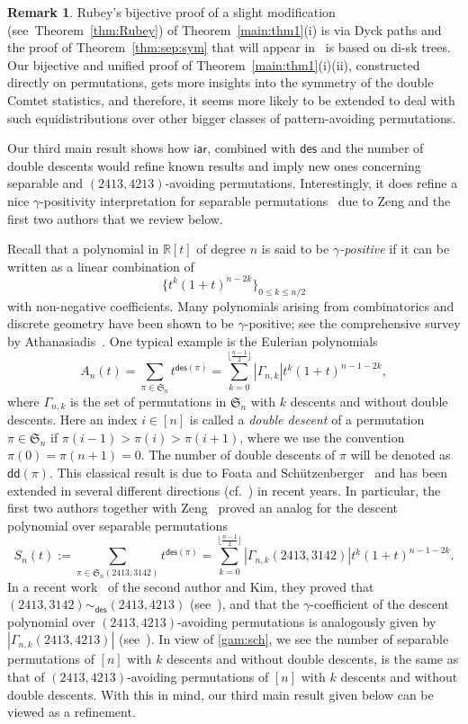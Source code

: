 \documentclass[12pt]{amsart}
\numberwithin{equation}{section}
\theoremstyle{plain}
\theoremstyle{definition}
\newtheorem{remark}[theorem]{Remark}
\newcommand{\RR}{\mathbb{R}}
\def\des{\mathsf{des}}
\def\S{\mathfrak{S}}
\def\iar{\mathsf{iar}}
\def\dd{\mathsf{dd}}
\begin{document}
\begin{remark}  Rubey's bijective proof of a slight modification (see~Theorem~\ref{thm:Rubey}) of Theorem~\ref{main:thm1}(i) is via Dyck paths and the proof of Theorem~\ref{thm:sep:sym} that will appear in~\cite{flw2} is based on di-sk trees. Our bijective and unified proof of Theorem~\ref{main:thm1}(i)(ii), constructed directly on permutations, gets more insights into the symmetry of the double Comtet statistics, and therefore, it seems more likely to be extended to deal with such equidistributions over other bigger classes of pattern-avoiding permutations. 
\end{remark}

Our third main result shows how $\iar$, combined with $\des$ and the number of double descents would refine known results and imply new ones concerning separable and $(2413,4213)$-avoiding permutations. Interestingly, it does refine a nice $\gamma$-positivity interpretation for separable permutations~\cite{flz,lin} due to Zeng and the first two authors that we review below. 

Recall that a polynomial in $\RR[t]$ of degree $n$ is said to be {\em $\gamma$-positive} if it can be written as a linear combination of
$$
\{t^k(1 + t)^{n-2k}\}_{0\leq k\leq n/2}
$$
with non-negative coefficients. Many polynomials arising from  combinatorics and discrete geometry have been shown to be $\gamma$-positive; see the comprehensive  survey by Athanasiadis~\cite{ath}. One typical example is  the  Eulerian polynomials
$$
A_n(t)=\sum_{\pi\in\S_n}t^{\des(\pi)}=\sum_{k=0}^{\lfloor\frac{n-1}{2}\rfloor}|\Gamma_{n,k}|t^k(1 + t)^{n-1-2k},
$$
where $\Gamma_{n,k}$ is the set of permutations in $\S_n$ with $k$ descents and without double descents. Here an index
$i\in[n]$ is called a {\em double descent} of a permutation  $\pi\in\S_n$ if $\pi(i-1)>\pi(i)>\pi(i+1)$, where we use the convention $\pi(0)=\pi(n+1)=0$. The number of double descents of $\pi$ will be denoted as $\dd(\pi)$. This classical result is due to Foata and Sch\"utzenberger~\cite[Theorem~5.6]{FS} and has been extended in several different directions (cf.~\cite{ath}) in recent years. In particular, the first two authors together with Zeng~\cite{flz,lin} proved an analog for the descent polynomial over separable permutations 
\begin{equation}\label{gam:sch}
S_n(t):=\sum_{\pi\in\S_n(2413,3142)}t^{\des(\pi)}=\sum_{k=0}^{\lfloor\frac{n-1}{2}\rfloor}|\Gamma_{n,k}(2413,3142)|t^k(1 + t)^{n-1-2k}.
\end{equation}
In a recent work~\cite{LK} of the second author and Kim, they proved that $(2413,3142)\sim_{\des}(2413,4213)$ (see~\cite[Thm.~5.1]{LK}), and that  the $\gamma$-coefficient of the descent polynomial over $(2413,4213)$-avoiding permutations is analogously given by $|\Gamma_{n,k}(2413,4213)|$ (see~\cite[Eq.~(4.10)]{LK}). In view of \eqref{gam:sch}, we see the number of separable permutations of $[n]$ with $k$ descents and without double descents, is the same as that of $(2413,4213)$-avoiding permutations of $[n]$ with $k$ descents and without double descents. With this in mind, our third main result given below can be viewed as a refinement.
\end{document}
